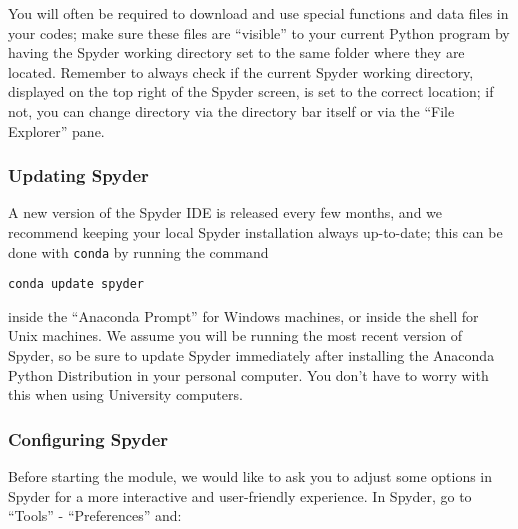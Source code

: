 You will often be required to download and use special functions and data files in your codes; make sure these files are ``visible'' to your current Python program by having the Spyder working directory set to the same folder where they are located. Remember to always check if the current Spyder working directory, displayed on the top right of the Spyder screen, is set to the correct location; if not, you can change directory via the directory bar itself or via the ``File Explorer'' pane.

\subsubsection{Updating Spyder}

A new version of the Spyder IDE is released every few months, and we recommend keeping your local Spyder installation always up-to-date; this can be done with {\tt conda} by running the command

\begin{lstlisting}[frame=single]
conda update spyder
\end{lstlisting}

inside the ``Anaconda Prompt'' for Windows machines, or inside the shell for Unix machines. We assume you will be running the most recent version of Spyder, so be sure to update Spyder immediately after installing the Anaconda Python Distribution in your personal computer. You don't have to worry with this when using University computers.

\subsubsection{Configuring Spyder}

Before starting the module, we would like to ask you to adjust some options in Spyder for a more interactive and user-friendly experience. In Spyder, go to ``Tools'' - ``Preferences'' and:

